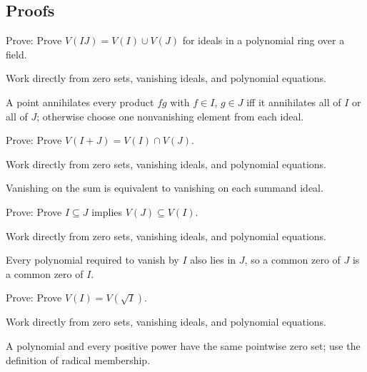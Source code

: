 \subsection*{Proofs}

\begin{exercise}\label{exr:vi01-expand-06}
Prove: Prove $V(IJ)=V(I)\cup V(J)$ for ideals in a polynomial ring over a field.
\end{exercise}
\begin{hint}
Work directly from zero sets, vanishing ideals, and polynomial equations.
\end{hint}
\begin{solution}
A point annihilates every product $fg$ with $f\in I$, $g\in J$ iff it annihilates all of $I$ or all of $J$; otherwise choose one nonvanishing element from each ideal.
\end{solution}

\begin{exercise}\label{exr:vi01-expand-07}
Prove: Prove $V(I+J)=V(I)\cap V(J)$.
\end{exercise}
\begin{hint}
Work directly from zero sets, vanishing ideals, and polynomial equations.
\end{hint}
\begin{solution}
Vanishing on the sum is equivalent to vanishing on each summand ideal.
\end{solution}

\begin{exercise}\label{exr:vi01-expand-08}
Prove: Prove $I\subseteq J$ implies $V(J)\subseteq V(I)$.
\end{exercise}
\begin{hint}
Work directly from zero sets, vanishing ideals, and polynomial equations.
\end{hint}
\begin{solution}
Every polynomial required to vanish by $I$ also lies in $J$, so a common zero of $J$ is a common zero of $I$.
\end{solution}

\begin{exercise}\label{exr:vi01-expand-09}
Prove: Prove $V(I)=V(\sqrt I)$.
\end{exercise}
\begin{hint}
Work directly from zero sets, vanishing ideals, and polynomial equations.
\end{hint}
\begin{solution}
A polynomial and every positive power have the same pointwise zero set; use the definition of radical membership.
\end{solution}

